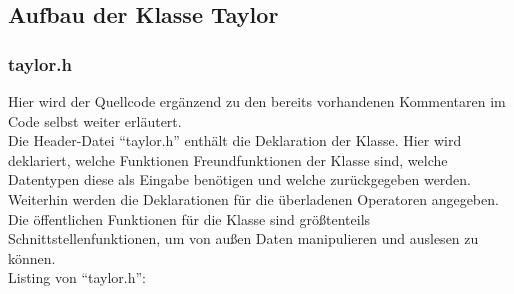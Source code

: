 \documentclass{scrartcl}
\begin{document}
\subsection{Aufbau der Klasse Taylor}
        
        \subsubsection{taylor.h}
Hier wird der Quellcode ergänzend zu den bereits vorhandenen Kommentaren im Code selbst weiter erläutert.\\
Die Header-Datei "`taylor.h"' enthält die Deklaration der Klasse. Hier wird deklariert, welche Funktionen Freundfunktionen der Klasse sind, welche Datentypen\hspace*{2} diese\hspace*{2} als Eingabe benötigen und welche zurückgegeben werden. Weiterhin werden die Deklarationen für die überladenen Operatoren angegeben. Die öffentlichen Funktionen für die Klasse sind größtenteils Schnittstellenfunktionen, um von außen Daten manipulieren und auslesen zu können.\\
\newpage
\noindent Listing von "`taylor.h"':
\end{document}
